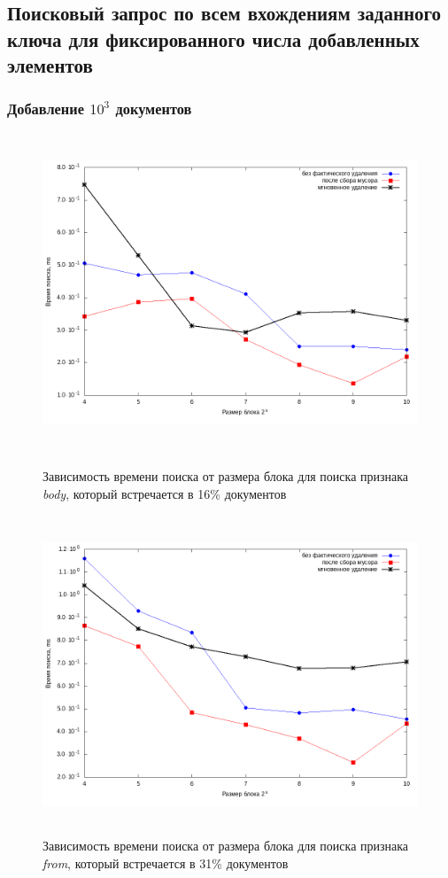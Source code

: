 \subsection{Поисковый запрос по всем вхождениям заданного ключа для фиксированного числа добавленных элементов}

\subsubsection{Добавление $10^3$ документов}

\begin{figure}[H]
\includegraphics[width=\linewidth, height=9.5cm]{fig/limit_1e6/1e3/body.png}
\caption{Зависимость времени поиска от размера блока для поиска признака \textit{body}, который встречается в 16\% документов}
\includegraphics[width=\linewidth, height=9.5cm]{fig/limit_1e6/1e3/from.png}
\caption{Зависимость времени поиска от размера блока для поиска признака \textit{from}, который встречается в 31\% документов}
\end{figure}

